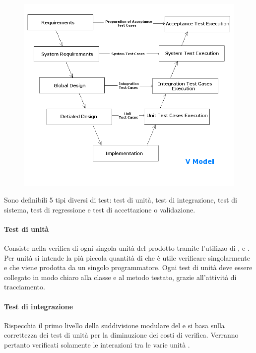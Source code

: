 \documentclass[12pt,a4paper]{article}
\begin{document}
		\begin{figure}[H]
			\centering
			\includegraphics[width=0.9\linewidth]{../img/v-model}
			\caption[Modello a V per collaudo del ]{}
			\label{fig:v-model}
		\end{figure}
		
	Sono definibili 5 tipi diversi di test: test di unità, test di integrazione, test di sistema, test di regressione e test di accettazione o validazione.
	
	\paragraph{Test di unità}
	Consiste nella verifica di ogni singola unità del prodotto  tramite l'utilizzo di ,  e . Per unità si intende la più piccola quantità di  che è utile verificare singolarmente e che viene prodotta da un singolo programmatore. Ogni test di unità deve essere collegato in modo chiaro alla classe e al metodo testato, grazie all'attività di tracciamento.
	
	\paragraph{Test di integrazione}
	Rispecchia il primo livello della suddivisione modulare del  e si basa sulla correttezza dei test di unità per la diminuzione dei costi di verifica. Verranno pertanto verificati solamente le interazioni tra le varie unità .
	
\end{document}
